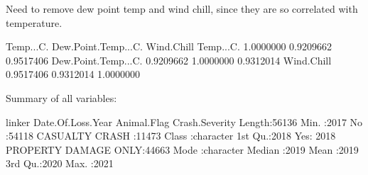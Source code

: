 \documentclass[11pt, a4paper]{article}
\begin{document}
\begin{Schunk}
\begin{Soutput}
Need to remove dew point temp and wind chill, 
since they are so correlated with temperature.
\end{Soutput}
\begin{Soutput}
                    Temp...C. Dew.Point.Temp...C. Wind.Chill
Temp...C.           1.0000000           0.9209662  0.9517406
Dew.Point.Temp...C. 0.9209662           1.0000000  0.9312014
Wind.Chill          0.9517406           0.9312014  1.0000000
\end{Soutput}
\begin{Soutput}
Summary of all variables:
\end{Soutput}
\begin{Soutput}
    linker          Date.Of.Loss.Year Animal.Flag              Crash.Severity 
 Length:56136       Min.   :2017      No :54118   CASUALTY CRASH      :11473  
 Class :character   1st Qu.:2018      Yes: 2018   PROPERTY DAMAGE ONLY:44663  
 Mode  :character   Median :2019                                              
                    Mean   :2019                                              
                    3rd Qu.:2020                                              
                    Max.   :2021                                              
                                                                              

\end{Soutput}
\end{Schunk}
\end{document}
